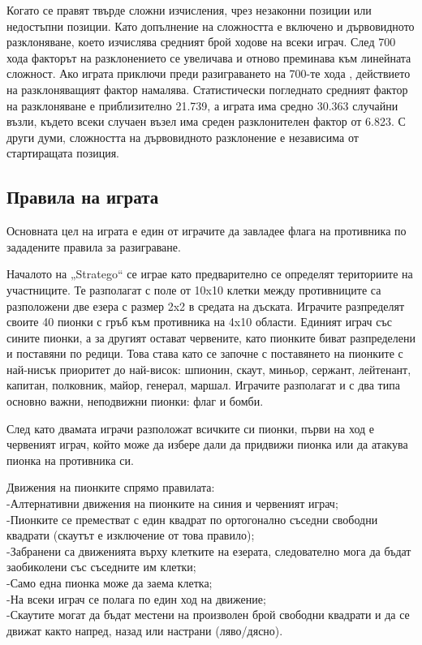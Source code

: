 Когато се правят твърде сложни изчисления, чрез незаконни позиции или недостъпни  позиции. Като допълнение на сложността е включено и дървовидното разклоняване, което изчислява средният брой ходове на всеки играч. След 700 хода факторът на разклонението се увеличава и отново преминава към линейната сложност. Ако играта приключи преди разиграването на 700-те хода , действието на разклоняващият фактор намалява. Статистически погледнато средният фактор на разклоняване е приблизително 21.739, а играта има средно 30.363 случайни възли, където всеки случаен възел има среден разклонителен фактор от 6.823. С други думи, сложността на дървовидното разклонение е независима от стартиращата позиция.

\subsection{Правила на играта}

Основната цел на играта е един от играчите да завладее флага на противника по зададените правила за разиграване.

Началото на „Stratego“ се играе като предварително се определят териториите на участниците. Те разполагат с поле от 10x10 клетки между противниците са разположени две езера с размер 2x2 в средата на дъската. Играчите разпределят своите 40 пионки с гръб към противника на 4x10 области. Единият играч със сините пионки, а за другият остават червените, като пионките биват разпределени и поставяни по редици. Това става като се започне с поставянето на пионките с най-нисък приоритет до най-висок: шпионин, скаут, миньор, сержант, лейтенант, капитан, полковник, майор, генерал, маршал. Играчите разполагат и с два типа основно важни, неподвижни пионки: флаг и бомби.

След като двамата играчи разположат всичките си пионки, първи на ход е червеният играч, който може да избере дали да придвижи пионка или да атакува пионка на противника си.

Движения на пионките спрямо правилата: \\
-Алтернативни движения на пионките на синия и червеният играч; \\
-Пионките се преместват с един квадрат по ортогонално съседни свободни квадрати (скаутът е изключение от това правило); \\
-Забранени са движенията върху клетките на езерата, следователно мога да бъдат заобиколени със съседните им клетки; \\
-Само една пионка може да заема клетка; \\
-На всеки играч се полага по един ход на движение; \\
-Скаутите могат да бъдат местени на произволен брой свободни квадрати и да се движат както напред, назад или настрани (ляво/дясно).

